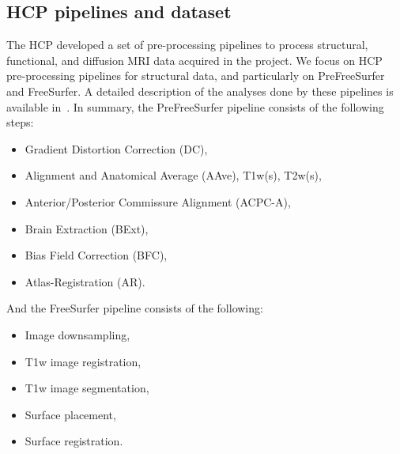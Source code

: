 \documentclass[a4paper,num-refs]{oup-contemporary}
\begin{document}


\subsection{HCP pipelines and dataset}


The HCP developed a set of pre-processing pipelines to process structural,
functional, and diffusion MRI data acquired in the project. We focus on HCP
pre-processing pipelines for structural data, and particularly
on PreFreeSurfer and FreeSurfer.
A detailed description of the analyses done by these
pipelines is available in~\cite{glasser2013}.
In summary, the PreFreeSurfer pipeline consists of the following steps:
\begin{itemize}
\item Gradient Distortion Correction (DC),
\item Alignment and Anatomical Average (AAve), T1w(s), T2w(s),
\item Anterior/Posterior Commissure Alignment (ACPC-A),
\item Brain Extraction (BExt),
\item Bias Field Correction (BFC),
\item Atlas-Registration (AR).
\end{itemize}
And the FreeSurfer pipeline consists of the following:
\begin{itemize}
\item Image downsampling,
\item T1w image registration,
\item T1w image segmentation,
\item Surface placement,
\item Surface registration.
\end{itemize}
\end{document}
